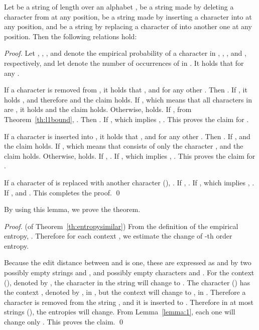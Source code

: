 \documentclass{llncs}
\begin{document}
\begin{lemma}\label{lemma:1}
Let  be a string of length  over an alphabet , 
 be a string made by deleting a character from 
at any position,  be a string made by inserting a character into 
at any position,
and  be a string by replacing a character of  into another one
at any position.
Then the following relations hold:

\end{lemma}

\begin{proof}
Let , , , and  denote the empirical probability of a character 
in , , , and , respectively, and let  denote the number of occurrences of  in .
It holds that  for any .

If a character  is removed from , it holds that
, and 
for any other .  Then 
.
If , it holds , and therefore  and the claim holds.
If , which means that all characters in  are , it holds  and the claim holds.
Otherwise,  holds.
If , from Theorem~\ref{th:l1bound}, 
.
Then .
If , which implies , .
This proves the claim for .

If a character  is inserted into , it holds that
, and 
for any other .  Then .
If ,  and the claim holds.
If , which means that  consists of only the character ,  and the claim holds.
Otherwise,  holds.
If , .
If , which implies , .
This proves the claim for .

If a character  of  is replaced with another character  (),
.
If ,
.
If , which implies , 
.
If ,  and .
This completes the proof.
\qed
\end{proof}

By using this lemma, we prove the theorem.

\begin{proof}(of Theorem~\ref{th:entropysimilar})
From the definition of the empirical entropy, .
Therefore for each context , we estimate the change of -th order entropy.

Because the edit distance between  and  is one,
these are expressed as  and 
by two possibly empty strings  and , and possibly empty characters
 and .
For the context  (), denoted by ,
the character  in the string  will change to .
The character  () has the context , denoted by ,
in , but the context will change to , in .
Therefore a character  is removed from the string , and it is inserted to .
Therefore in at most  strings (),
the entropies will change.  From Lemma~\ref{lemma:1}, each one will change only .
This proves the claim.
\qed
\end{proof}
\end{document}
